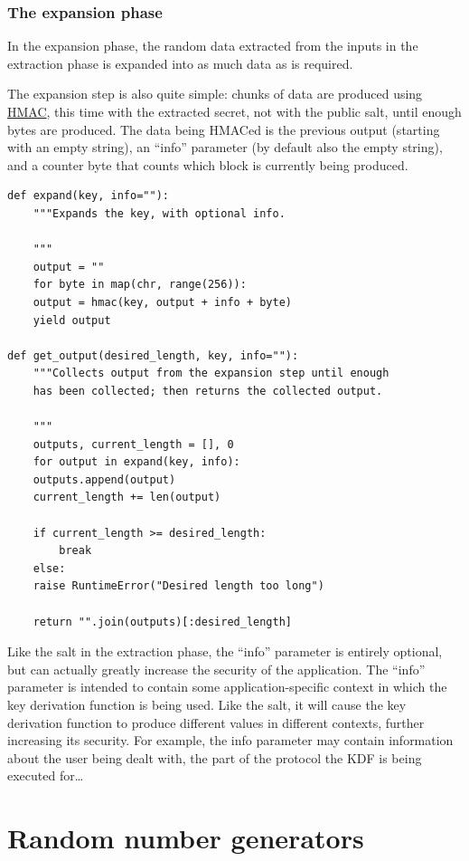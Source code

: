 \documentclass[11pt,ebook,table,dvipsnames]{memoir}
\begin{document}
\subsection{The expansion phase}
\label{sec-2-9-6-2}

In the expansion phase, the random data extracted from the inputs in
the extraction phase is expanded into as much data as is required.

The expansion step is also quite simple: chunks of data are produced
using \hyperref[HMAC]{HMAC}, this time with the extracted secret, not with the public
salt, until enough bytes are produced. The data being HMACed is the
previous output (starting with an empty string), an \enquote{info} parameter
(by default also the empty string), and a counter byte that counts
which block is currently being produced.

\begin{verbatim}
def expand(key, info=""):
    """Expands the key, with optional info.

    """
    output = ""
    for byte in map(chr, range(256)):
	output = hmac(key, output + info + byte)
	yield output

def get_output(desired_length, key, info=""):
    """Collects output from the expansion step until enough
    has been collected; then returns the collected output.

    """
    outputs, current_length = [], 0
    for output in expand(key, info):
	outputs.append(output)
	current_length += len(output)

	if current_length >= desired_length:
	    break
    else:
	raise RuntimeError("Desired length too long")

    return "".join(outputs)[:desired_length]
\end{verbatim}

Like the salt in the extraction phase, the \enquote{info} parameter is
entirely optional, but can actually greatly increase the security of
the application. The \enquote{info} parameter is intended to contain some
application-specific context in which the key derivation function is
being used. Like the salt, it will cause the key derivation function
to produce different values in different contexts, further increasing
its security. For example, the info parameter may contain information
about the user being dealt with, the part of the protocol the KDF is
being executed for\ldots{} \cite{rfc5869}
\chapter{Random number generators}
\label{sec-2-10}
\end{document}
